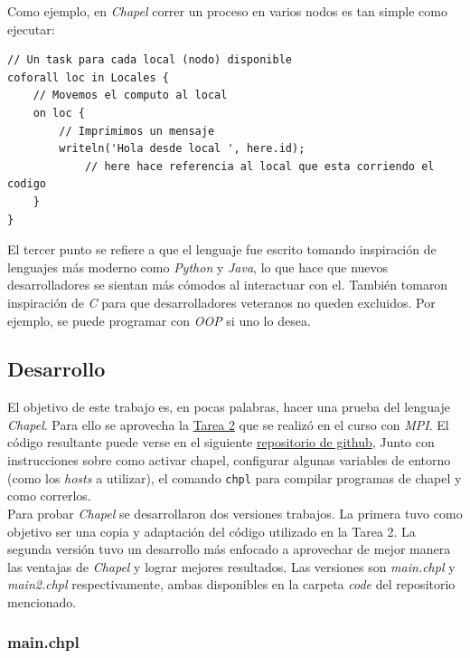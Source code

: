 \documentclass[10pt]{extarticle}
\begin{document}
Como ejemplo, en \textit{Chapel} correr un proceso en varios nodos es tan simple como ejecutar:

\begin{lstlisting}[language=Chapel]
// Un task para cada local (nodo) disponible
coforall loc in Locales {
	// Movemos el computo al local
	on loc {
		// Imprimimos un mensaje
		writeln('Hola desde local ', here.id);
			// here hace referencia al local que esta corriendo el codigo
	}
}
\end{lstlisting}

El tercer punto se refiere a que el lenguaje fue escrito tomando inspiración de lenguajes más moderno como \textit{Python} y \textit{Java}, lo que hace que nuevos desarrolladores se sientan más cómodos al interactuar con el. También tomaron inspiración de \textit{C} para que desarrolladores veteranos no queden excluidos. Por ejemplo, se puede programar con \textit{OOP} si uno lo desea.

\subsection*{Desarrollo}
El objetivo de este trabajo es, en pocas palabras, hacer una prueba del lenguaje \textit{Chapel}. Para ello se aprovecha la \href{https://github.com/negebauer/IIC3524-T2}{\color{blue!60}Tarea 2} que se realizó en el curso con \textit{MPI}. El código resultante puede verse en el siguiente \href{https://github.com/negebauer/IIC3524-Investigacion}{\color{blue!60}repositorio de github}, Junto con instrucciones sobre como activar chapel, configurar algunas variables de entorno (como los \textit{hosts} a utilizar), el comando \verb|chpl| para compilar programas de chapel y como correrlos.\\

Para probar \textit{Chapel} se desarrollaron dos versiones trabajos. La primera tuvo como objetivo ser una copia y adaptación del código utilizado en la Tarea 2. La segunda versión tuvo un desarrollo más enfocado a aprovechar de mejor manera las ventajas de \textit{Chapel} y lograr mejores resultados. Las versiones son \textit{main.chpl} y \textit{main2.chpl} respectivamente, ambas disponibles en la carpeta \textit{code} del repositorio mencionado.\\

\subsubsection*{main.chpl}
\end{document}
